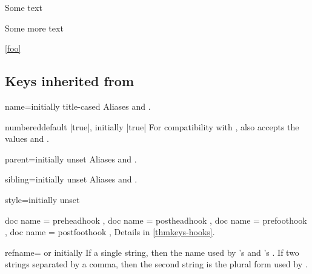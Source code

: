 \documentclass{ltxdoc}
\begin{document}
\begin{thmkeyscode}[preamble]
\begin{mytheorem}[a note]
Some text
\end{mytheorem}

\begin{mytheorem}[
  name=a heading,
  label=foo
  ]
Some more text
\end{mytheorem}

\ref{foo}
\end{thmkeyscode}

\subsection{Keys inherited from }

\begin{docKey}[][doc label=thm/name]{name}{=}{initially title-cased }
Aliases  and .
\end{docKey}

\begin{docKey}{numbered}{}{default |true|, initially |true|}
For compatibility with , also accepts the values  and .
\end{docKey}

\begin{docKey}{parent}{=}{initially unset}
Aliases  and .
\end{docKey}

\begin{docKey}{sibling}{=}{initially unset}
Aliases  and .
\end{docKey}

\begin{docKey}{style}{=}{initially unset}

\end{docKey}

\begin{docKeys}[
  doc parameter = {=\meta{code}},
  doc description = initially unset,
  ]
  {
	{ doc name = preheadhook },
	{ doc name = postheadhook },
	{ doc name = prefoothook },
	{ doc name = postfoothook },
  }
Details in \autoref{thmkeys-hooks}.
\end{docKeys}

\begin{docKey}{refname}{= or }{initially }
If a single string, then the name used by 's  and 's . If two strings separated by a comma, then the second string is the plural form used by .
\end{docKey}
\end{document}

